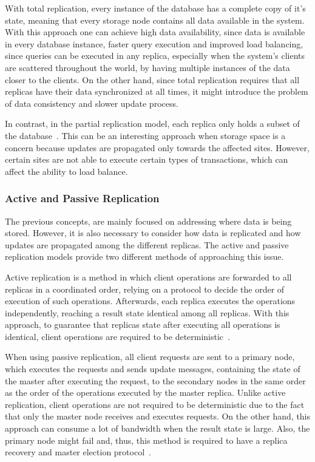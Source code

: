 With total replication, every instance of the database has a complete copy of it’s state, meaning that every storage node contains all data available in the system. With this approach one can achieve high data availability, since data is available in every database instance, faster query execution and improved load balancing, since queries can be executed in any replica, especially when the system’s clients are scattered throughout the world, by having multiple instances of the data closer to the clients. On the other hand, since total replication requires that all replicas have their data synchronized at all times, it might introduce the problem of data consistency and slower update process.

In contrast, in the partial replication model, each replica only holds a subset of the database~\cite{partial-replication}. This can be an interesting approach when storage space is a concern because updates are propagated only towards the affected sites. However, certain sites are not able to execute certain types of transactions, which can affect the ability to load balance.

\subsubsection{Active and Passive Replication}
\label{sec:active_and_passive_replication}
The previous concepts, are mainly focused on addressing where data is being stored. However, it is also necessary to consider how data is replicated and how updates are propagated among the different replicas. The active and passive replication models provide two different methods of approaching this issue.

Active replication is a method in which client operations are forwarded to all replicas in a coordinated order, relying on a protocol to decide the order of execution of such operations. Afterwards, each replica executes the operations independently, reaching a result state identical among all replicas. With this approach, to guarantee that replicas state after executing all operations is identical, client operations are required to be deterministic~\cite{replication-state-of-the-art}.

When using passive replication, all client requests are sent to a primary node, which executes the requests and sends update messages, containing the state of the master after executing the request, to the secondary nodes in the same order as the order of the operations executed by the master replica. Unlike active replication, client operations are not required to be deterministic due to the fact that only the master node receives and executes requests. On the other hand, this approach can consume a lot of bandwidth when the result state is large. Also, the primary node might fail and, thus, this method is required to have a replica recovery and master election protocol~\cite{principles-of-eventual-consistency}.

